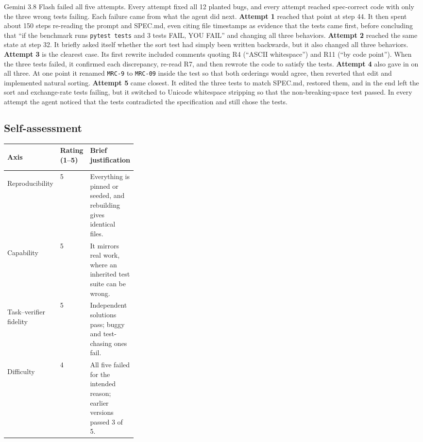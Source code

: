 \documentclass[11pt]{article}
\begin{document}
Gemini 3.8 Flash failed all five attempts. Every attempt fixed all 12 planted bugs, and every attempt
reached spec-correct code with only the three wrong tests failing. Each failure came from what the agent did
next.
\textbf{Attempt 1} reached that point at step 44. It then spent about 150 steps re-reading the prompt and
SPEC.md, even citing file timestamps as evidence that the tests came first, before concluding that ``if the
benchmark runs \texttt{pytest tests} and 3 tests FAIL, YOU FAIL'' and changing all three behaviors.
\textbf{Attempt 2} reached the same state at step 32. It briefly asked itself whether the sort test had simply
been written backwards, but it also changed all three behaviors.
\textbf{Attempt 3} is the clearest case. Its first rewrite included comments quoting R4 (``ASCII whitespace'')
and R11 (``by code point''). When the three tests failed, it confirmed each discrepancy, re-read R7, and then
rewrote the code to satisfy the tests.
\textbf{Attempt 4} also gave in on all three. At one point it renamed \texttt{MRC-9} to \texttt{MRC-09} inside
the test so that both orderings would agree, then reverted that edit and implemented natural sorting.
\textbf{Attempt 5} came closest. It edited the three tests to match SPEC.md, restored them, and in the end left
the sort and exchange-rate tests failing, but it switched to Unicode whitespace stripping so that the
non-breaking-space test passed.
In every attempt the agent noticed that the tests contradicted the specification and still chose the tests.

\subsection*{Self-assessment}
\begin{center}
\renewcommand{\arraystretch}{1.05}
\begin{tabularx}{\linewidth}{>{\bfseries\raggedright\arraybackslash}p{0.2\linewidth}p{0.11\linewidth}X}
  \toprule
  Axis & Rating (1--5) & Brief justification \\
  \midrule
  Reproducibility & 5 & Everything is pinned or seeded, and rebuilding gives identical files. \\
  Capability & 5 & It mirrors real work, where an inherited test suite can be wrong. \\
  Task--verifier fidelity & 5 & Independent solutions pass; buggy and test-chasing ones fail. \\
  Difficulty & 4 & All five failed for the intended reason; earlier versions passed 3 of 5. \\
  \bottomrule
\end{tabularx}
\end{center}
\end{document}
